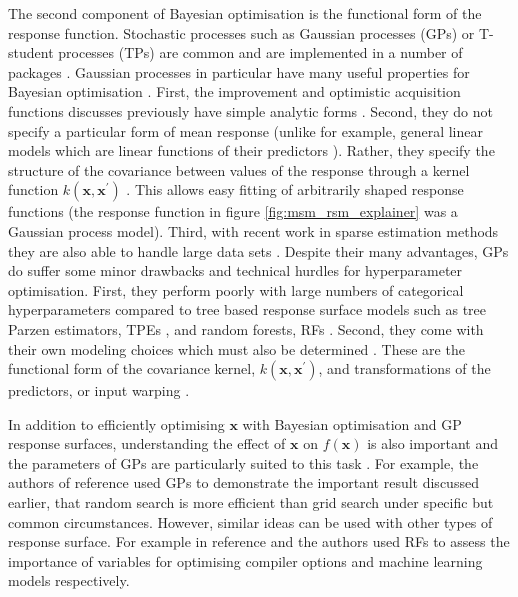 The second component of Bayesian optimisation is the functional form of the response function. Stochastic processes such as Gaussian processes (GPs) or T-student processes (TPs) \cite{rasmussenGaussianProcessesMachine2006} are common and are implemented in a number of packages \cite{martinez-cantinBayesOptBayesianOptimization2014,NIPS2012_4522,gpyopt2016,JMLR:v21:18-223,mcgibbonOspreyHyperparameterOptimization2016,liuAuptimizerExtensibleOpenSource2019}. Gaussian processes in particular have many useful properties for Bayesian optimisation \cite{feurer2019hyperparameter,brochuTutorialBayesianOptimization2010,jonesEfficientGlobalOptimization1998}.  First, the improvement and optimistic acquisition functions discusses previously have simple analytic forms \cite{brochuTutorialBayesianOptimization2010}. Second, they do not specify a particular form of mean response (unlike for example, general linear models which are linear functions of their predictors \cite{dobson2018introduction}). Rather, they specify the structure of the covariance between values of the response through a kernel function $k(\mathbf{x}, \mathbf{x}^{\prime})$ \cite{rasmussenGaussianProcessesMachine2006}. This allows easy fitting of arbitrarily shaped response functions (the response function in figure \ref{fig:msm_rsm_explainer} was a Gaussian process model).  Third, with recent work in sparse estimation methods they are also able to handle large data sets \cite{quinonero-candelaUnifyingViewSparse2005}. Despite their many advantages, GPs do suffer some minor drawbacks and technical hurdles for hyperparameter optimisation. First, they perform poorly with large numbers of categorical hyperparameters \cite{eggensperger2013towards} compared to tree based response surface models such as tree Parzen estimators, TPEs \cite{bergstraAlgorithmsHyperParameterOptimizationa}, and random forests, RFs \cite{hutterSequentialModelbasedOptimization2011,breiman2001}.  Second, they come with their own modeling choices which must also be determined \cite{rasmussenGaussianProcessesMachine2006}.  These are the functional form of the covariance kernel, $k(\mathbf{x}, \mathbf{x}^{\prime})$, and transformations of the predictors, or input warping \cite{snoekInputWarpingBayesian2014a}. 

In addition to efficiently optimising $\mathbf{x}$ with Bayesian optimisation and GP response surfaces, understanding the effect of $\mathbf{x}$ on $f(\mathbf{x})$ is also important and the parameters of GPs are particularly suited to this task \cite{rasmussenGaussianProcessesMachine2006}. For example, the authors of reference \cite{bergstrajamesbergstraRandomSearchHyperParameter2012} used GPs to demonstrate the important result discussed earlier, that random search is more efficient than grid search under specific but common circumstances. However, similar ideas can be used with other types of response surface. For example in  reference \cite{gramacyVariableSelectionSensitivity2013} and \cite{pmlr-v32-hutter14} the authors used  RFs to assess the importance of variables for optimising compiler options and machine learning models respectively. 

